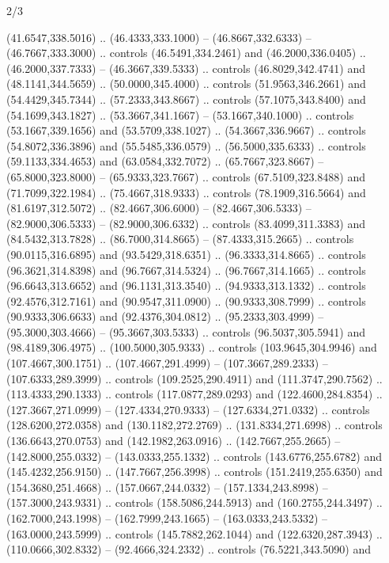 \begin{flagdescription}{2/3}
\begin{scope}[xshift=0.5\flaglength,yshift=0.5\flagwidth,scale=\flagwidth/525.28]
\begin{scope}[y=0.1mm, x=0.1mm, yscale=-1,shift={(-381.5,-404)}]
\begin{scope}[shift={(5.25001,4.53053)},miter limit=4.00,line width=0.800\lw]
  (41.6547,338.5016) .. (46.4333,333.1000) -- (46.8667,332.6333) --
  (46.7667,333.3000) .. controls (46.5491,334.2461) and (46.2000,336.0405) ..
  (46.2000,337.7333) -- (46.3667,339.5333) .. controls (46.8029,342.4741) and
  (48.1141,344.5659) .. (50.0000,345.4000) .. controls (51.9563,346.2661) and
  (54.4429,345.7344) .. (57.2333,343.8667) .. controls (57.1075,343.8400) and
  (54.1699,343.1827) .. (53.3667,341.1667) -- (53.1667,340.1000) .. controls
  (53.1667,339.1656) and (53.5709,338.1027) .. (54.3667,336.9667) .. controls
  (54.8072,336.3896) and (55.5485,336.0579) .. (56.5000,335.6333) .. controls
  (59.1133,334.4653) and (63.0584,332.7072) .. (65.7667,323.8667) --
  (65.8000,323.8000) -- (65.9333,323.7667) .. controls (67.5109,323.8488) and
  (71.7099,322.1984) .. (75.4667,318.9333) .. controls (78.1909,316.5664) and
  (81.6197,312.5072) .. (82.4667,306.6000) -- (82.4667,306.5333) --
  (82.9000,306.5333) -- (82.9000,306.6332) .. controls (83.4099,311.3383) and
  (84.5432,313.7828) .. (86.7000,314.8665) -- (87.4333,315.2665) .. controls
  (90.0115,316.6895) and (93.5429,318.6351) .. (96.3333,314.8665) .. controls
  (96.3621,314.8398) and (96.7667,314.5324) .. (96.7667,314.1665) .. controls
  (96.6643,313.6652) and (96.1131,313.3540) .. (94.9333,313.1332) .. controls
  (92.4576,312.7161) and (90.9547,311.0900) .. (90.9333,308.7999) .. controls
  (90.9333,306.6633) and (92.4376,304.0812) .. (95.2333,303.4999) --
  (95.3000,303.4666) -- (95.3667,303.5333) .. controls (96.5037,305.5941) and
  (98.4189,306.4975) .. (100.5000,305.9333) .. controls (103.9645,304.9946) and
  (107.4667,300.1751) .. (107.4667,291.4999) -- (107.3667,289.2333) --
  (107.6333,289.3999) .. controls (109.2525,290.4911) and (111.3747,290.7562) ..
  (113.4333,290.1333) .. controls (117.0877,289.0293) and (122.4600,284.8354) ..
  (127.3667,271.0999) -- (127.4334,270.9333) -- (127.6334,271.0332) .. controls
  (128.6200,272.0358) and (130.1182,272.2769) .. (131.8334,271.6998) .. controls
  (136.6643,270.0753) and (142.1982,263.0916) .. (142.7667,255.2665) --
  (142.8000,255.0332) -- (143.0333,255.1332) .. controls (143.6776,255.6782) and
  (145.4232,256.9150) .. (147.7667,256.3998) .. controls (151.2419,255.6350) and
  (154.3680,251.4668) .. (157.0667,244.0332) -- (157.1334,243.8998) --
  (157.3000,243.9331) .. controls (158.5086,244.5913) and (160.2755,244.3497) ..
  (162.7000,243.1998) -- (162.7999,243.1665) -- (163.0333,243.5332) --
  (163.0000,243.5999) .. controls (145.7882,262.1044) and (122.6320,287.3943) ..
  (110.0666,302.8332) -- (92.4666,324.2332) .. controls (76.5221,343.5090) and

\end{scope}
\end{scope}
\end{scope}
\end{flagdescription}
